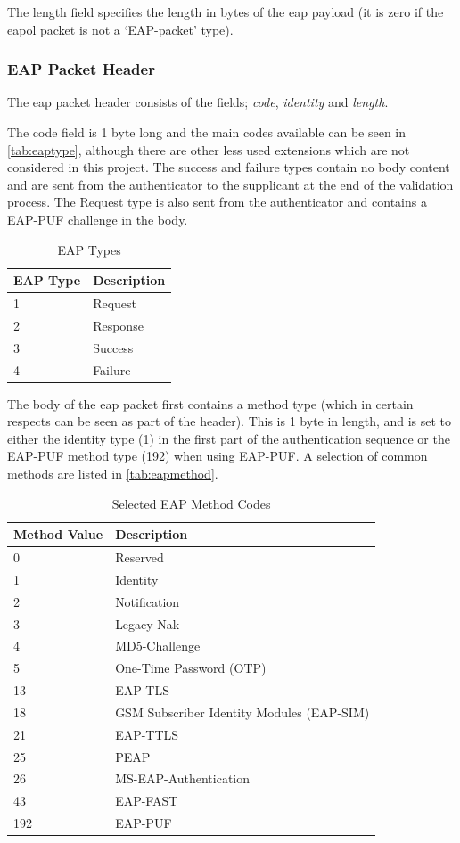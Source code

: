 The length field specifies the length in bytes of the \gls{eap} payload (it is
zero if the \gls{eapol} packet is not a `EAP-packet' type).

\subsubsection{EAP Packet Header}

The \gls{eap} packet header consists of the fields; \emph{code}, \emph{identity}
and \emph{length}.

The code field is 1 byte long and the main codes
available can be seen in \autoref{tab:eaptype}, although there are other less
used extensions which are not considered in this project.
The success and failure types contain no body content and are sent from the
authenticator to the supplicant at the end of the validation process.
The Request type is also sent from the authenticator and contains a EAP-PUF
challenge in the body.

\begin{table}
\begin{tabular}{ll}
\hline
EAP Type & Description  \\ \hline
1 & Request \\
2 & Response \\
3 & Success \\
4 & Failure \\
\end{tabular}
\caption{EAP Types}
\label{tab:eaptype}
\end{table}

The body of the \gls{eap} packet first contains a method type (which in certain
respects can be seen as part of the header). This is 1 byte in length, and is set to either
the identity type (1) in the first part of the authentication sequence or the
EAP-PUF method type (192) when using EAP-PUF. A selection of common methods are
listed in \autoref{tab:eapmethod}.

\begin{table}
\begin{tabular}{ll}
\hline
Method Value & Description  \\ \hline
  0 & Reserved \\
  1 & Identity \\
  2 & Notification \\
  3 & Legacy Nak \\
  4 & MD5-Challenge \\
  5 & One-Time Password (OTP) \\
 13 & EAP-TLS \\
 18 & GSM Subscriber Identity Modules (EAP-SIM) \\
 21 & EAP-TTLS \\
 25 & PEAP \\
 26 & MS-EAP-Authentication \\
 43 & EAP-FAST \\
192 & EAP-PUF \\
\end{tabular}
\caption{Selected EAP Method Codes}
\label{tab:eapmethod}
\end{table}


